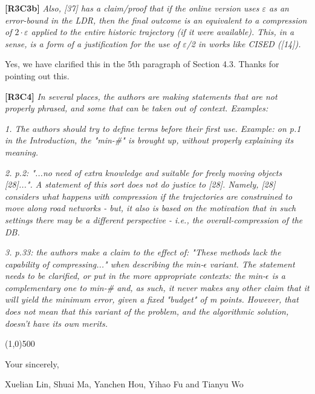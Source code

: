 \documentclass{letter}
\begin{document}
\textbf{[R3C3b]} \emph{Also, [37] has a claim/proof that if the online version uses $\varepsilon$ as an error-bound in the LDR, then the final outcome is an equivalent to a compression of $2 \cdot \varepsilon$ applied to the entire historic trajectory (if it were available). This, in a sense, is a form of a justification  for the use of $\varepsilon$/2 in works like CISED ([14]).}

Yes, we have clarified this in the 5th paragraph of Section 4.3. Thanks for pointing out this.

\textbf{[R3C4]} \emph{
In several places, the authors are making statements that are not properly phrased, and some that can be taken out of context. Examples:}

\emph{1. The authors should try to define terms before their first use. Example: on p.1 in the Introduction, the "min-\#" is brought up, without properly explaining its meaning.}


\emph{2. p.2: "...no need of extra knowledge and suitable for freely moving objects [28]...". A statement of this sort does not do justice to [28].
Namely, [28] considers what happens with compression if the trajectories are constrained to move along road networks - but, it also is based on the motivation that in such settings there may be a different perspective - i.e., the overall-compression of the DB.}



\emph{3. p.33: the authors make a claim to the effect of: "These methods lack the capability of compressing..." when describing the min-$\epsilon$ variant. The statement needs to be clarified, or put in the more appropriate contexts: the min-$\epsilon$  is a complementary one to min-\# and, as such, it never makes any other claim that it will yield the minimum error, given a fixed "budget" of m points. However, that does not mean that this variant of the problem, and the algorithmic solution, doesn't have its own merits.}



\line(1,0){500}



Your sincerely,

Xuelian Lin, Shuai Ma, Yanchen Hou, Yihao Fu and Tianyu Wo

%
%
\end{document}
